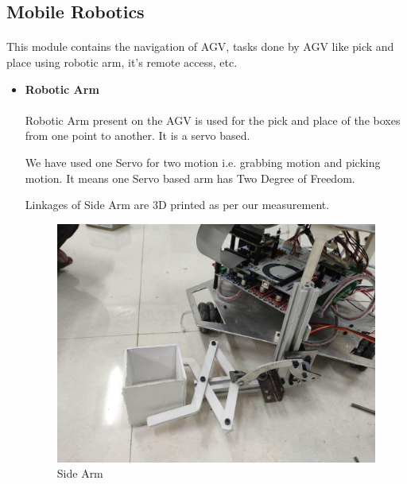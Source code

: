 \newpage

\subsection{Mobile Robotics}
\paragraph{}This module contains the navigation of AGV, tasks done by AGV like pick and place using robotic arm, it's remote access, etc.

\begin{itemize}[wide, labelwidth=!, labelindent=0pt]
    \item \textbf{Robotic Arm}
    \vspace{-0.5cm}
    \paragraph{}Robotic Arm present on the AGV is used for the pick and place of the boxes from one point to another. It is a servo based.
    
    We have used one Servo for two motion i.e. grabbing motion and picking motion. It means one Servo based arm has Two Degree of Freedom.
    
    Linkages of Side Arm are 3D printed as per our measurement.
    
    \begin{figure}[H]
    \centering
    \includegraphics[width = 13cm]{project/images/side_arm.jpg}
    \caption{Side Arm}
    \end{figure}
    

\end{itemize}

